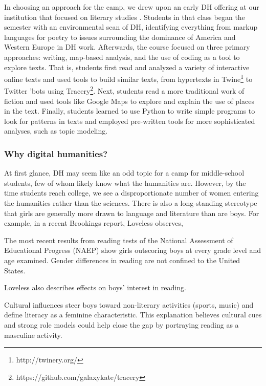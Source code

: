 In choosing an approach for the camp, we drew upon an early DH
offering at our institution that focused on literary studies
\cite{Simpson-Eng295}.
Students in that class began the semester with an
environmental scan of DH, identifying everything
from markup languages for poetry to issues surrounding the dominance
of America and Western Europe in DH work. Afterwards, the
course focused on three primary approaches: writing, map-based
analysis, and the use of coding as a tool to explore texts.  That
is, students first read and analyzed a variety of interactive online
texts and used tools to build similar texts, from hypertexts in
Twine\footnote{http://twinery.org/} to Twitter 'bots using
Tracery\footnote{https://github.com/galaxykate/tracery}.  Next,
students read a more traditional work of fiction and used tools
like Google Maps to explore and explain the use of places in the
text.  Finally, students learned to use Python to write simple
programs to look for patterns in texts and employed pre-written
tools for more sophisticated analyses, such as topic modeling.  

\subsubsection{Why digital humanities?}

At first glance, DH may seem like an odd topic
for a camp for middle-school students, few of whom likely know what
the humanities are.  However, by the time students reach college,
we see a disproportionate number of women entering the
humanities rather than the sciences.  There is also a long-standing
stereotype that girls are generally more drawn to language and literature
than are boys.  For example, in a recent Brookings report, Loveless \cite{Loveless2015} observes, 
\begin{blockquote}
The most recent results from reading tests of the National Assessment of Educational Progress (NAEP) show girls outscoring boys at every grade level and age examined. Gender differences in reading are not confined to the United States.
\end{blockquote}

\noindent 
Loveless also describes effects on boys' interest in reading.
\begin{blockquote}
Cultural influences steer boys
toward non-literary activities (sports, music) and define literacy
as a feminine characteristic. This explanation believes cultural
cues and strong role models could help close the gap by portraying
reading as a masculine activity.
\end{blockquote}

